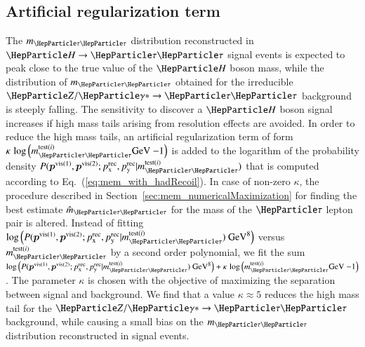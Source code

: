 \subsection{Artificial regularization term}
\label{sec:mem_logM}

The $m_{\Pgt\Pgt}$ distribution reconstructed in $\PHiggs \to \Pgt\Pgt$ signal events is expected to peak close to the true value of the $\PHiggs$ boson mass,
while the distribution of $m_{\Pgt\Pgt}$ obtained for the irreducible $\PZ/\Pggx \to \Pgt\Pgt$ background is steeply falling.
The sensitivity to discover a $\PHiggs$ boson signal increases if high mass tails arising from resolution effects are avoided.
In order to reduce the high mass tails,
an artificial regularization term of form $\kappa \, \log \left( m_{\Pgt\Pgt}^{\textrm{test}(i)} \mbox{GeV}~{-1} \right)$ is added to the logarithm of the probability density $P(\bm{p}^{\vis(1)},\bm{p}^{\vis(2)};\pX^{\rec},\pY^{\rec}|m_{\Pgt\Pgt}^{\textrm{test}(i)})$
that is computed according to Eq.~(\ref{eq:mem_with_hadRecoil}).
In case of non-zero $\kappa$,
the procedure described in Section~\ref{sec:mem_numericalMaximization} for finding the best estimate $\hat{m}_{\Pgt\Pgt}$ for the mass of the $\Pgt$ lepton pair is altered.
Instead of fitting $\log \left( P(\bm{p}^{\vis(1)},\bm{p}^{\vis(2)};\pX^{\rec},\pY^{\rec}|m_{\Pgt\Pgt}^{\textrm{test}(i)})  \mbox{~GeV}^{8} \right)$ versus $m_{\Pgt\Pgt}^{\textrm{test}(i)}$ by a second order polynomial,
we fit the sum $\log \left( P(\bm{p}^{\vis(1)},\bm{p}^{\vis(2)};\pX^{\rec},\pY^{\rec}|m_{\Pgt\Pgt}^{\textrm{test}(i)})  \mbox{~GeV}^{8} \right) + \kappa \, \log \left( m_{\Pgt\Pgt}^{\textrm{test}(i)} \mbox{GeV}~{-1} \right)$.
The parameter $\kappa$ is chosen with the objective of maximizing the separation between signal and background.
We find that a value $\kappa \approx 5$ reduces the high mass tail for the $\PZ/\Pggx \to \Pgt\Pgt$ background,
while causing a small bias on the $m_{\Pgt\Pgt}$ distribution reconstructed in signal events.
